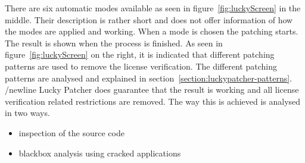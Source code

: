 There are six automatic modes available as seen in figure~\ref{fig:luckyScreen} in the middle.
Their description is rather short and does not offer information of how the modes are applied and working.
\newline
When a mode is chosen the patching starts.
The result is shown when the process is finished.
As seen in figure~\ref{fig:luckyScreen} on the right, it is indicated that different patching patterns are used to remove the license verification.
The different patching patterns are analysed and explained in section~\ref{section:luckypatcher-patterns}.
/newline
Lucky Patcher does guarantee that the result is working and all license verification related restrictions are removed.
\newline
The way this is achieved is analysed in two ways.
\begin{itemize}
\item inspection of the source code
\item blackbox analysis using cracked applications
\end{itemize}
